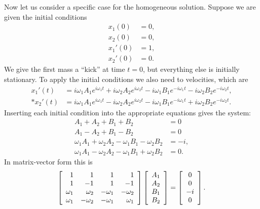 Now let us consider a specific case for the homogeneous solution. Suppose we are given the initial conditions 
\begin{align}
  x_1(0)  &= 0, \nonumber \\
  x_2(0)  &= 0, \nonumber \\
  x_1'(0) &= 1, \nonumber \\
  x_2'(0) &= 0. 
\end{align}
We give the first mass a ``kick'' at time $t = 0$, but everything else is initially stationary. To apply the initial conditions we also need to velocities, which are
\begin{subequations}
\begin{align}
  x_1'(t) &= i \omega_1 A_1 e^{i \omega_1 t} + i \omega_2 A_2 e^{i \omega_2 t} - i \omega_1 B_1 e^{-i \omega_1 t} - i \omega_2 B_2 e^{-i \omega_2 t} , \\*
  x_2'(t) &= i \omega_1 A_1 e^{i \omega_1 t} - i \omega_2 A_2 e^{i \omega_2 t} - i \omega_1 B_1 e^{-i \omega_1 t} + i \omega_2 B_2 e^{-i \omega_2 t} .
\end{align}
\end{subequations}
Inserting each initial condition into the appropriate equations gives the system:
\begin{subequations}
\begin{align}
  A_1 + A_2 + B_1 + B_2 &= 0 \\
  A_1 - A_2 + B_1 - B_2 &= 0 \\
  \omega_1 A_1 + \omega_2 A_2 - \omega_1 B_1 - \omega_2 B_2 &= -i, \\
  \omega_1 A_1 - \omega_2 A_2 - \omega_1 B_1 + \omega_2 B_2 &= 0.
\end{align}
\end{subequations}
In matrix-vector form this is
\begin{align}
  \left[ \begin{array}{r r r r}
  1 &  1 & 1 &  1 \\
  1 & -1 & 1 & -1 \\
  \omega_1 &  \omega_2 & -\omega_1 & -\omega_2 \\
  \omega_1 & -\omega_2 & -\omega_1 &  \omega_1 \\ \end{array} \right]
  \left[ \begin{array}{c} A_1 \\ A_2 \\ B_1 \\ B_2 \\ \end{array} \right] =
  \left[ \begin{array}{c} 0 \\ 0 \\ -i \\ 0 \\ \end{array} \right] .
\end{align}
